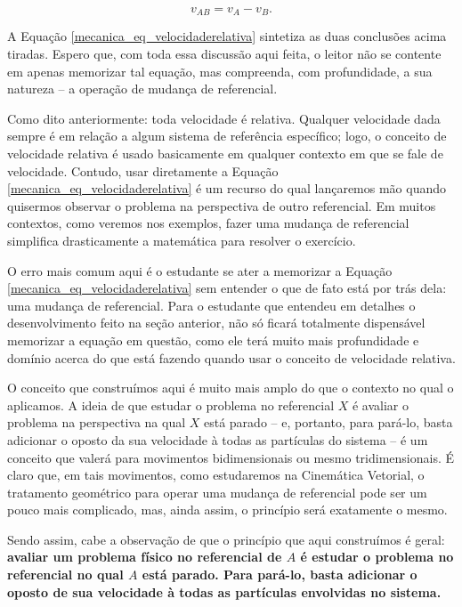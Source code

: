 $$ \boxed{v_{AB}=v_A-v_B.}$$

A Equação \eqref{mecanica_eq_velocidaderelativa} sintetiza as duas conclusões acima tiradas. Espero que, com toda essa discussão aqui feita, o leitor não se contente em apenas memorizar tal equação, mas compreenda, com profundidade, a sua natureza -- a operação de mudança de referencial.


Como dito anteriormente: toda velocidade é relativa. Qualquer velocidade dada sempre é em relação a algum sistema de referência específico; logo, o conceito de velocidade relativa é usado basicamente em qualquer contexto em que se fale de velocidade. Contudo, usar diretamente a Equação \eqref{mecanica_eq_velocidaderelativa} é um recurso do qual lançaremos mão quando quisermos observar o problema na perspectiva de outro referencial. Em muitos contextos, como veremos nos exemplos, fazer uma mudança de referencial simplifica drasticamente a matemática para resolver o exercício.



O erro mais comum aqui é o estudante se ater a memorizar a Equação \eqref{mecanica_eq_velocidaderelativa} sem entender o que de fato está por trás dela: uma mudança de referencial. Para o estudante que entendeu em detalhes o desenvolvimento feito na seção anterior, não só ficará totalmente dispensável memorizar a equação em questão, como ele terá muito mais profundidade e domínio acerca do que está fazendo quando usar o conceito de velocidade relativa.



O conceito que construímos aqui é muito mais amplo do que o contexto no qual o aplicamos. A ideia de que estudar o problema no referencial $X$ é avaliar o problema na perspectiva na qual $X$ está parado -- e, portanto, para pará-lo, basta adicionar o oposto da sua velocidade à todas as partículas do sistema -- é um conceito que valerá para movimentos bidimensionais ou mesmo tridimensionais. É claro que, em tais movimentos, como estudaremos na Cinemática Vetorial, o tratamento geométrico para operar uma mudança de referencial pode ser um pouco mais complicado, mas, ainda assim, o princípio será exatamente o mesmo.

Sendo assim, cabe a observação de que o princípio que aqui construímos é geral: \textbf{avaliar um problema físico no referencial de $A$ é estudar o problema no referencial no qual $A$ está parado. Para pará-lo, basta adicionar o oposto de sua velocidade à todas as partículas envolvidas no sistema.}


